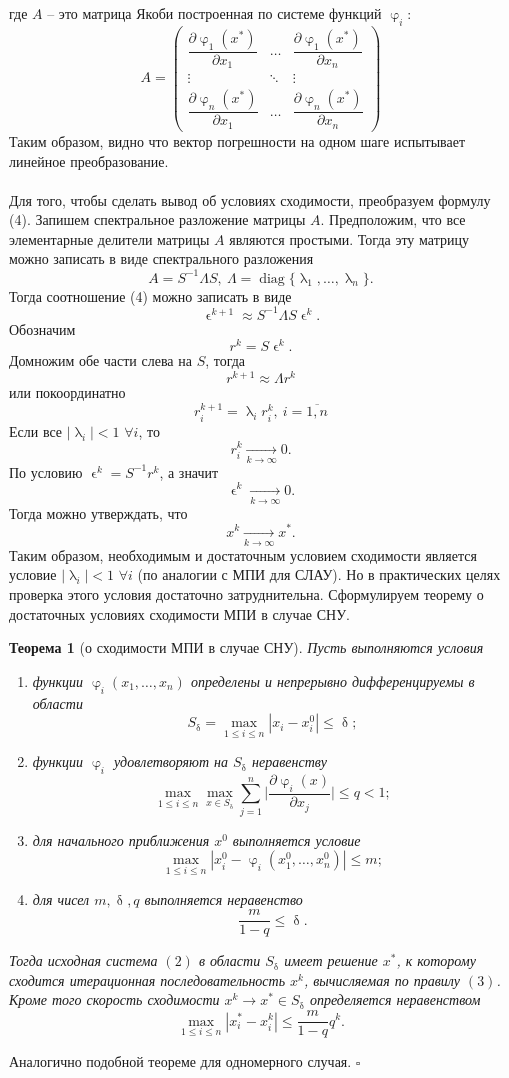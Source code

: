 \documentclass[a4paper, 12pt]{report}
\numberwithin{equation}{section}
\newenvironment{Proof} %
{\par\noindent{$\blacklozenge$}} %
{\hfill$\scriptstyle\square$}
\renewcommand{\leq}{\leqslant}
\renewcommand{\delta}{\updelta}
\renewcommand{\varphi}{\upvarphi}
\renewcommand{\lambda}{\uplambda}
\renewcommand{\varepsilon}{\upvarepsilon}
\newtheorem*{theorem}{Теорема}
\begin{document}
где $A$ -- это матрица Якоби построенная по системе функций $\varphi_i$:
$$A = \begin{pmatrix}
	\dfrac{\partial \varphi_1(x^*)}{\partial x_1} & \dots & \dfrac{\partial \varphi_1(x^*)}{\partial x_n}\\
	\vdots & \ddots & \vdots\\
	\dfrac{\partial \varphi_n(x^*)}{\partial x_1} & \dots & \dfrac{\partial \varphi_n(x^*)}{\partial x_n}
\end{pmatrix}$$ 
Таким образом, видно что вектор погрешности на одном шаге испытывает линейное преобразование.
\\\\
Для того, чтобы сделать вывод об условиях сходимости, преобразуем формулу (4). Запишем спектральное разложение матрицы $A$. Предположим, что все элементарные делители матрицы $A$ являются простыми. Тогда эту матрицу можно записать в виде спектрального разложения $$A = S^{-1}\Lambda S,\ \Lambda = \operatorname{diag}\{\lambda_1,\ldots, \lambda_n\}.$$
Тогда соотношение (4) можно записать в виде $$\varepsilon^{k+1} \approx S^{-1}\Lambda S \varepsilon^k.$$
Обозначим $$r^k = S \varepsilon^k.$$
Домножим обе части слева на $S$, тогда $$r^{k+1}\approx \Lambda r^k$$
или покоординатно $$r_i^{k+1} = \lambda_i r^k_i,\ i=\overline{1,n}$$
Если все $|\lambda_i| <1$ $\forall i$, то $$r_i^k\xrightarrow[k\to \infty]{}0.$$ По условию $\varepsilon^k = S^{-1}r^{k}$, а значит $$\varepsilon^k\xrightarrow[k\to \infty]{}0.$$
Тогда можно утверждать, что $$x^k\xrightarrow[k\to\infty]{} x^*.$$
Таким образом, необходимым и достаточным условием сходимости является условие $|\lambda_i| <1$ $\forall i$ (по аналогии с МПИ для СЛАУ). Но в практических целях проверка этого условия достаточно затруднительна. Сформулируем теорему о достаточных условиях сходимости МПИ в случае СНУ.
\begin{theorem}
	[о сходимости МПИ в случае СНУ]
	Пусть выполняются условия\begin{enumerate}
		\item функции $\varphi_i(x_1,\ldots, x_n)$ определены и непрерывно дифференцируемы в области $$S_\delta = \max_{1\leq i \leq n}|x_i - x^0_i|\leq \delta;$$
		\item функции $\varphi_i$ удовлетворяют на $S_\delta$ неравенству
		$$\max_{1\leq i \leq n} \max_{x \in S_\delta} \sum_{j=1}^{n}\Big|\dfrac{\partial \varphi_i(x)}{\partial x_j}\Big|\leq q < 1;$$
		\item для начального приближения $x^0$ выполняется условие $$\max_{1\leq i \leq n}|x_i^0 - \varphi_i(x_1^0,\ldots, x_n^0)| \leq m;$$
		\item для чисел $m,\delta, q$ выполняется неравенство $$\dfrac{m}{1-q}\leq \delta.$$
	\end{enumerate}
	Тогда исходная система $(2)$ в области $S_\delta$ имеет решение $x^*$, к которому сходится итерационная последовательность $x^k$, вычисляемая по правилу $(3)$. Кроме того скорость сходимости $x^k \to x^* \in S_\delta$ определяется неравенством $$\max_{1\leq i \leq n}|x_i^* -x_i^k|\leq \dfrac{m}{1-q}q^k.$$
\end{theorem}
\begin{Proof}
	Аналогично подобной теореме для одномерного случая.
\end{Proof}
\end{document}
